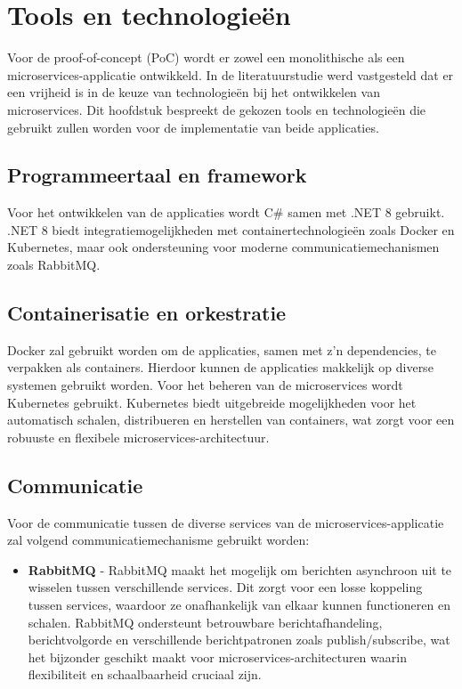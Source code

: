 \section{Tools en technologieën}
\label{tools_en_technologieën}

Voor de proof-of-concept (PoC) wordt er zowel een monolithische als een microservices-applicatie ontwikkeld. In de literatuurstudie werd vastgesteld dat er een vrijheid is in de keuze van technologieën bij het ontwikkelen van microservices. Dit hoofdstuk bespreekt de gekozen tools en technologieën die gebruikt zullen worden voor de implementatie van beide applicaties.

\subsection{Programmeertaal en framework}

Voor het ontwikkelen van de applicaties wordt C\# samen met .NET 8 gebruikt. .NET 8 biedt integratiemogelijkheden met containertechnologieën zoals Docker en Kubernetes, maar ook ondersteuning voor moderne communicatiemechanismen zoals RabbitMQ.

\subsection{Containerisatie en orkestratie}

Docker zal gebruikt worden om de applicaties, samen met z'n dependencies, te verpakken als containers. Hierdoor kunnen de applicaties makkelijk op diverse systemen gebruikt worden. Voor het beheren van de microservices wordt Kubernetes gebruikt. Kubernetes biedt uitgebreide mogelijkheden voor het automatisch schalen, distribueren en herstellen van containers, wat zorgt voor een robuuste en flexibele microservices-architectuur.

\subsection{Communicatie}

Voor de communicatie tussen de diverse services van de microservices-applicatie zal volgend communicatiemechanisme gebruikt worden:

\begin{itemize}
	\item \textbf{RabbitMQ} - RabbitMQ maakt het mogelijk om berichten asynchroon uit te wisselen tussen verschillende services. Dit zorgt voor een losse koppeling tussen services, waardoor ze onafhankelijk van elkaar kunnen functioneren en schalen. RabbitMQ ondersteunt betrouwbare berichtafhandeling, berichtvolgorde en verschillende berichtpatronen zoals publish/subscribe, wat het bijzonder geschikt maakt voor microservices-architecturen waarin flexibiliteit en schaalbaarheid cruciaal zijn.
\end{itemize}

